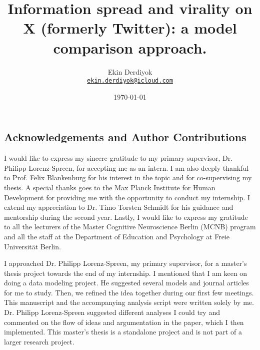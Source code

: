 \documentclass[11pt,a4paper]{article}
\begin{document}
\title{Information spread and virality on X (formerly Twitter): a model comparison approach.}
\author{Ekin Derdiyok\\ 
\texttt{\href{mailto:ekin.derdiyok@icloud.com}{ekin.derdiyok@icloud.com}}}
\date{\today}
\maketitle
\pagestyle{plain}



\newpage
\doublespacing
\begin{center}
    \section*{Acknowledgements and Author Contributions}     
\end{center}
I would like to express my sincere gratitude to my primary supervisor, Dr. Philipp Lorenz-Spreen, for accepting me as an intern. I am also deeply thankful to Prof. Felix Blankenburg for his interest in the topic and for co-supervising my thesis. A special thanks goes to the Max Planck Institute for Human Development for providing me with the opportunity to conduct my internship. I extend my appreciation to Dr. Timo Torsten Schmidt for his guidance and mentorship during the second year. Lastly, I would like to express my gratitude to all the lecturers of the Master Cognitive Neuroscience Berlin (MCNB) program and all the staff at the Department of Education and Psychology at Freie Universität Berlin.

I approached Dr. Philipp Lorenz-Spreen, my primary supervisor, for a master's thesis project towards the end of my internship. I mentioned that I am keen on doing a data modeling project. He suggested several models and journal articles for me to study. Then, we refined the idea together during our first few meetings. This manuscript and the accompanying analysis script were written solely by me. Dr. Philipp Lorenz-Spreen suggested different analyses I could try and commented on the flow of ideas and argumentation in the paper, which I then implemented. This master's thesis is a standalone project and is not part of a larger research project. 
\end{document}

